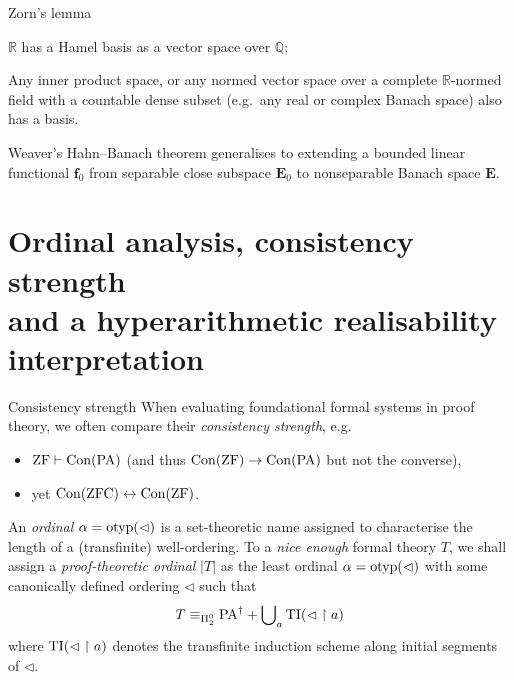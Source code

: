 \documentclass{beamer}
\begin{document}
\begin{frame}{Zorn's lemma}
  \begin{corollary}
    $\mathbb{R}$ has a Hamel basis as a vector space over $\mathbb{Q}$;

    \vspace{0.6em}

    Any inner product space, or any normed vector space over a complete $\mathbb{R}$-normed field with a countable dense subset (e.g.\ any real or complex Banach space) also has a basis.
  \end{corollary}

  \vspace{1em}

  \begin{corollary}
    Weaver's Hahn--Banach theorem generalises to extending a bounded linear functional $\mathbf{f}_0$ from separable close subspace $\mathbf{E}_0$ to nonseparable Banach space $\mathbf{E}$.
  \end{corollary}
\end{frame}

\section{Ordinal analysis, consistency strength\\and a hyperarithmetic realisability interpretation}

\begin{frame}{Consistency strength}
  When evaluating foundational formal systems in proof theory, we often compare their \emph{consistency strength}, e.g.
  \begin{itemize}
    \item $\mathrm{ZF} \vdash \mathrm{Con}\mleft(\mathrm{PA}\mright)$ (and thus $\mathrm{Con}\mleft(\mathrm{ZF}\mright) \rightarrow \mathrm{Con}\mleft(\mathrm{PA}\mright)$ but not the converse),
    \item yet $\mathrm{Con}\mleft(\mathrm{ZFC}\mright) \leftrightarrow \mathrm{Con}\mleft(\mathrm{ZF}\mright)$.
  \end{itemize}

  \pause

  \begin{definition}
    An \emph{ordinal} $\alpha = \mathrm{otyp}\mleft(\lhd\mright)$ is a set-theoretic name assigned to characterise the length of a (transfinite) well-ordering. To a \emph{nice enough} formal theory $T$, we shall assign a \emph{proof-theoretic ordinal} $\left|T\right|$ as the least ordinal $\alpha = \mathrm{otyp}\mleft(\lhd\mright)$ with some canonically defined ordering $\lhd$ such that
    \[T \equiv_{\Pi^0_2} \mathrm{PA}^\dagger + \bigcup\nolimits_a \mathrm{TI}\mleft(\lhd \upharpoonright a\mright)\]
    where $\mathrm{TI}\mleft(\lhd \upharpoonright a\mright)$ denotes the transfinite induction scheme along initial segments of $\lhd$. \cite{rathjen99-ordinal-analysis}
  \end{definition}
\end{frame}
\end{document}
